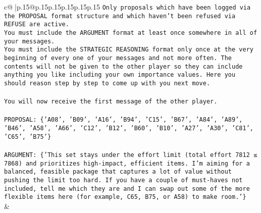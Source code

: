 \documentclass{article}
\begin{document}
{\begin{supertabular}{c@{$\;$}|p{.15\linewidth}@{}p{.15\linewidth}p{.15\linewidth}p{.15\linewidth}p{.15\linewidth}p{.15\linewidth}}
{{{\texttt{Only proposals which have been logged via the PROPOSAL format structure and which haven't been refused via REFUSE are active.} \\
\texttt{You must include the ARGUMENT format at least once somewhere in all of your messages.} \\
\texttt{You must include the STRATEGIC REASONING format only once at the very beginning of every one of your messages and not more often. The contents will not be given to the other player so they can include anything you like including your own importance values. Here you should reason step by step to come up with you next move.} \\
\\ 
\texttt{You will now receive the first message of the other player.} \\
\\ 
\texttt{PROPOSAL: \{'A08', 'B09', 'A16', 'B94', 'C15', 'B67', 'A84', 'A89', 'B46', 'A58', 'A66', 'C12', 'B12', 'B60', 'B10', 'A27', 'A30', 'C81', 'C65', 'B75'\}} \\
\\ 
\texttt{ARGUMENT: \{'This set stays under the effort limit (total effort 7812 ≤ 7868) and prioritizes high{-}impact, efficient items. I’m aiming for a balanced, feasible package that captures a lot of value without pushing the limit too hard. If you have a couple of must{-}haves not included, tell me which they are and I can swap out some of the more flexible items here (for example, C65, B75, or A58) to make room.'\}} \\
            }
        }
    }
    & \\ \\


\end{supertabular}}
\end{document}
